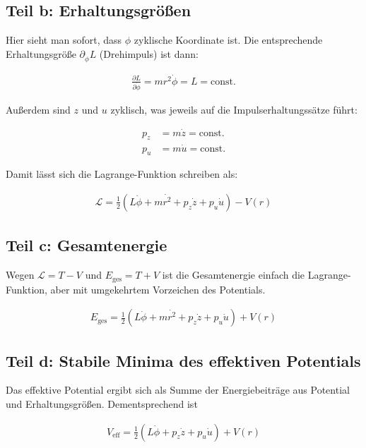 \documentclass[a4paper,german,12pt,smallheadings]{scrartcl}
\begin{document}
\subsection*{Teil b: Erhaltungsgrößen}

Hier sieht man sofort, dass $\phi$ zyklische Koordinate ist. Die entsprechende Erhaltungsgröße $\partial_{\dot{\phi}} L$ (Drehimpuls) ist dann:

\begin{align*}
  \frac{\partial L}{\partial \dot{\phi}} = mr^2 \dot{\phi} = L = \text{const.}
\end{align*}

Außerdem sind $z$ und $u$ zyklisch, was jeweils auf die Impulserhaltungssätze führt:

\begin{align*}
  p_z &= m\dot{z} = \text{const.} \\
  p_u &= m\dot{u} = \text{const.}
\end{align*}

Damit lässt sich die Lagrange-Funktion schreiben als:

\begin{align*}
  \mathcal{L} = \frac{1}{2}(L\dot{\phi} + m\dot{r^2} + p_z\dot{z} + p_u \dot{u}) - V(r)
\end{align*}

\subsection*{Teil c: Gesamtenergie}

Wegen $\mathcal{L} = T - V$ und $E_{\text{ges}} = T + V$ ist die Gesamtenergie
einfach die Lagrange-Funktion, aber mit umgekehrtem Vorzeichen des Potentials.

\begin{align*}
  E_{\text{ges}} = \frac{1}{2}(L\dot{\phi} + m\dot{r^2} + p_z\dot{z} + p_u \dot{u}) + V(r)
\end{align*}

\subsection*{Teil d: Stabile Minima des effektiven Potentials}
Das effektive Potential ergibt sich als Summe der Energiebeiträge aus Potential
und Erhaltungsgrößen. Dementsprechend ist

\begin{align*}
  V_{\text{eff}} = \frac{1}{2}(L\dot{\phi} + p_z\dot{z} + p_u \dot{u}) + V(r)
\end{align*}
\end{document}
